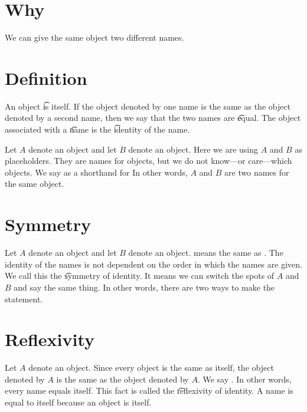 
\section*{Why}

We can give the same object two different names.

\section*{Definition}

An object \t{is} itself.
If the object denoted by one name is the same as the object denoted by a second name, then we say that the two names are \t{equal}.
The object associated with a \t{name} is the \t{identity} of the name.

Let $A$ denote an object and let $B$ denote an object.
Here we are using $A$ and $B$ as placeholders.
They are names for objects, but we do not know---or care---which objects.
We say  as a shorthand for 
In other words, $A$ and $B$ are two names for the same object.

\section*{Symmetry}

Let $A$ denote an object and let $B$ denote an object.
 means the same as .
The identity of the names is not dependent on the order in which the names are given.
We call this the \t{symmetry of identity}.
It means we can switch the spots of $A$ and $B$ and say the same thing.
In other words, there are two ways to make the statement.


\section*{Reflexivity}

Let $A$ denote an object.
Since every object is the same as itself, the object denoted by $A$ is the same as the object denoted by $A$.
We say .
In other words, every name equals itself.
This fact is called the \t{reflexivity of identity}.
A name is equal to itself because an object is itself.


